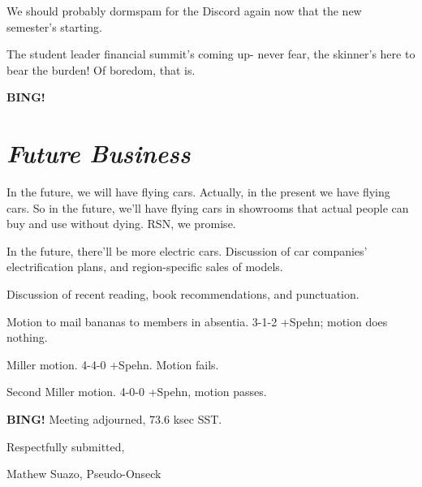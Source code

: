 \documentclass[10pt]{article}
\newcommand{\bing}{{\bf BING!} }
\newcommand{\goto}[1]{\bing \vskip 12pt \section*{{\em{#1}}}}
\newcommand{\onseck}{Mathew Suazo, Pseudo-Onseck\xspace}
\begin{document}
We should probably dormspam for the Discord again now that the new semester's starting.

The student leader financial summit's coming up- never fear, the skinner's here to bear the burden! Of boredom, that is.

\goto{Future Business}

In the future, we will have flying cars. Actually, in the present we have flying cars. So in the future, we'll have flying cars in showrooms that actual people can buy and use without dying. RSN, we promise.

In the future, there'll be more electric cars. Discussion of car companies' electrification plans, and region-specific sales of models.

Discussion of recent reading, book recommendations, and punctuation.

Motion to mail bananas to members in absentia. 3-1-2 +Spehn; motion does nothing.

Miller motion. 4-4-0 +Spehn. Motion fails.

Second Miller motion. 4-0-0 +Spehn, motion passes.

\bing
\noindent
Meeting adjourned, 73.6 ksec SST.

\vspace{18pt}

\centerline{Respectfully submitted,}
\centerline{\onseck}
\end{document}
